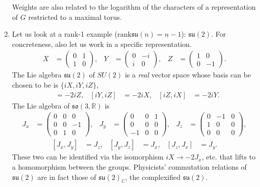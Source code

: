 \documentclass[aps,nofootinbib]{revtex4}
\begin{document}
\begin{enumerate}
Weights are also related to the logarithm of the characters of a representation of $G$ restricted to a maximal torus.

\item \label{angular momentum} Let us look at a rank-1 example ($\text{rank}\mathfrak{su}(n) = n-1 $): $\mathfrak{su}(2)$. For concreteness, also let us work in a specific representation.
\begin{align*}
X & =\left(\begin{array}{cc}
0 & 1\\
1 & 0
\end{array}\right),&
Y & =\left(\begin{array}{cc}
0 & -i\\
i & 0
\end{array}\right),&
Z & =\left(\begin{array}{cc}
1 & 0\\
0 & -1
\end{array}\right).
\end{align*}
The Lie algebra $\mathfrak{su}(2)$ of $SU(2)$ is a \emph{real} vector space whose basis can be chosen to be
is $\{ iX,iY,iZ \}$,
\begin{align}
[iX,iY] &= -2iZ,&
[iY,iZ] &= -2iX,&
[iZ,iX] &= -2iY.
\end{align}
The Lie algebra of $\mathfrak{so}(3,\mathbb{R})$ is
\begin{align*}
J_x & =\left(\begin{array}{ccc}
0 & 0 & 0\\
0 & 0 & -1\\
0 & 1 & 0
\end{array}\right),&
J_y & =\left(\begin{array}{ccc}
0 & 0 & 1\\
0 & 0 & 0\\
-1 & 0 & 0
\end{array}\right),&
J_z & =\left(\begin{array}{ccc}
0 & -1 & 0\\
1 & 0 & 0\\
0 & 0 & 0
\end{array}\right),
\end{align*}
\begin{align}
\left[J_x,J_y\right] & =J_z,&
\left[J_y,J_z\right] & =J_x,&
\left[J_z,J_x\right] & =J_y.
\end{align}
These two can be identified via the isomorphism $iX \to -2J_x$, etc. that lifts to a homomorphism between the groups. Physicists' commutation relations of $\mathfrak{su}(2)$ are in fact those of $\mathfrak{su}(2)_{\mathbb{C}}$, the complexified $\mathfrak{su}(2)$.

\end{enumerate}
\end{document}
